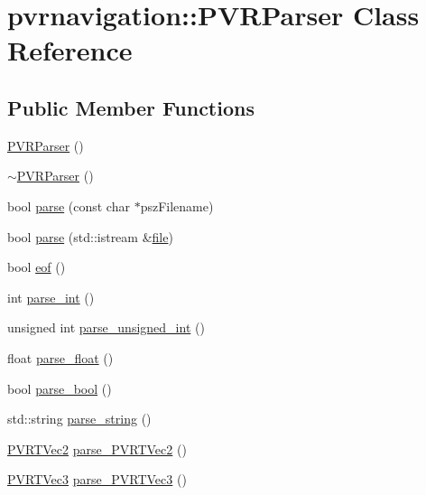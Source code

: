 \hypertarget{classpvrnavigation_1_1_p_v_r_parser}{\section{pvrnavigation\+:\+:P\+V\+R\+Parser Class Reference}
\label{classpvrnavigation_1_1_p_v_r_parser}
}
\subsection*{Public Member Functions}
\begin{DoxyCompactItemize}
\item 
\hyperlink{classpvrnavigation_1_1_p_v_r_parser_aeb85508ccaac8c2faaeac7714cf07306}{P\+V\+R\+Parser} ()
\item 
\hyperlink{classpvrnavigation_1_1_p_v_r_parser_aedb9dbe1a0b1c88e3ef8abfa9294dc71}{$\sim$\+P\+V\+R\+Parser} ()
\item 
bool \hyperlink{classpvrnavigation_1_1_p_v_r_parser_a9d1fbcef35708227e3b453873059b4aa}{parse} (const char $\ast$psz\+Filename)
\item 
bool \hyperlink{classpvrnavigation_1_1_p_v_r_parser_addce81f6060d4e36accbc11c36190e1d}{parse} (std\+::istream \&\hyperlink{structfile}{file})
\item 
bool \hyperlink{classpvrnavigation_1_1_p_v_r_parser_adf6359772ddd6346fd2ef621498d8fcb}{eof} ()
\item 
int \hyperlink{classpvrnavigation_1_1_p_v_r_parser_ae282129e18292d362ddb59097ffe3852}{parse\+\_\+int} ()
\item 
unsigned int \hyperlink{classpvrnavigation_1_1_p_v_r_parser_a2c66573e29eeb6da913be73909458dc8}{parse\+\_\+unsigned\+\_\+int} ()
\item 
float \hyperlink{classpvrnavigation_1_1_p_v_r_parser_a2fd249ea4e68db2af406a8af3cbf0649}{parse\+\_\+float} ()
\item 
bool \hyperlink{classpvrnavigation_1_1_p_v_r_parser_a69512ac55b954b3e9a444a3ac3e2d09f}{parse\+\_\+bool} ()
\item 
std\+::string \hyperlink{classpvrnavigation_1_1_p_v_r_parser_a86006bb8f3ba38cfaad364f09305ba8b}{parse\+\_\+string} ()
\item 
\hyperlink{struct_p_v_r_t_vec2}{P\+V\+R\+T\+Vec2} \hyperlink{classpvrnavigation_1_1_p_v_r_parser_a26181d098eb7473d0dd5bc9c67571fbf}{parse\+\_\+\+P\+V\+R\+T\+Vec2} ()
\item 
\hyperlink{struct_p_v_r_t_vec3}{P\+V\+R\+T\+Vec3} \hyperlink{classpvrnavigation_1_1_p_v_r_parser_a5d83c0097ad9df021f4bec9e0530d577}{parse\+\_\+\+P\+V\+R\+T\+Vec3} ()

\end{DoxyCompactItemize}
